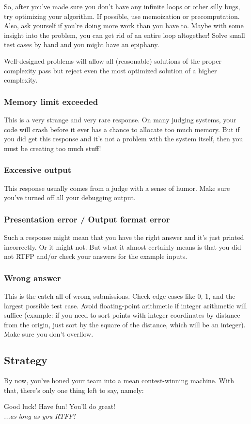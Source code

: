 \documentclass[a4paper,12pt]{article}
\begin{document}
So, after you've made sure you don't have any infinite loops or other silly bugs, try optimizing your algorithm. If possible, use memoization or precomputation. Also, ask yourself if you're doing more work than you have to. Maybe with some insight into the problem, you can get rid of an entire loop altogether! Solve small test cases by hand and you might have an epiphany.

Well-designed problems will allow all (reasonable) solutions of the proper complexity pass but reject even the most optimized solution of a higher complexity. 

\subsubsection{Memory limit exceeded}
This is a very strange and very rare response. On many judging systems, your code will crash before it ever has a chance to allocate too much memory. But if you did get this response and it's not a problem with the system itself, then you must be creating too much stuff! 

\subsubsection{Excessive output}
This response usually comes from a judge with a sense of humor. Make sure you've turned off all your debugging output.

\subsubsection{Presentation error / Output format error}
Such a response might mean that you have the right answer and it's just printed incorrectly. Or it might not. But what it almost certainly means is that you did not RTFP and/or check your answers for the example inputs.

\subsubsection{Wrong answer}
This is the catch-all of wrong submissions. Check edge cases like $0$, $1$, and the largest possible test case. Avoid floating-point arithmetic if integer arithmetic will suffice (example: if you need to sort points with integer coordinates by distance from the origin, just sort by the square of the distance, which will be an integer). Make sure you don't overflow.

\subsection{Strategy}
By now, you've honed your team into a mean contest-winning machine. With that, there's only one thing left to say, namely:\\[0.5cm]
\begin{center}
Good luck! Have fun! You'll do great!\\[0.5cm]
{\em ...as long as you RTFP!}
\end{center}
\end{document}
